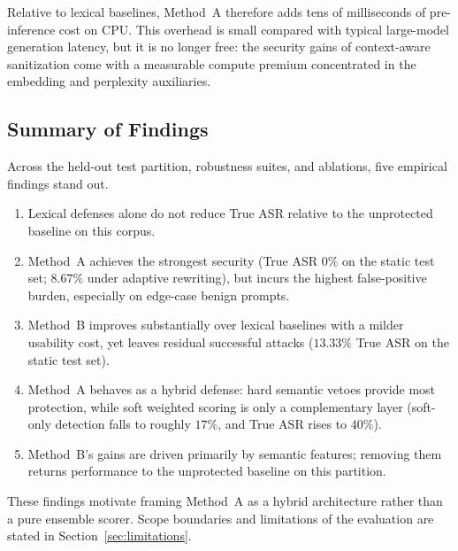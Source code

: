 Relative to lexical baselines, Method~A therefore adds tens of milliseconds of pre-inference cost on CPU.
This overhead is small compared with typical large-model generation latency, but it is no longer free: the security gains of context-aware sanitization come with a measurable compute premium concentrated in the embedding and perplexity auxiliaries.

\subsection{Summary of Findings}
\label{sec:results-summary}

Across the held-out test partition, robustness suites, and ablations, five empirical findings stand out.
\begin{enumerate}
  \item Lexical defenses alone do not reduce True ASR relative to the unprotected baseline on this corpus.
  \item Method~A achieves the strongest security (True ASR \(0\%\) on the static test set; \(8.67\%\) under adaptive rewriting), but incurs the highest false-positive burden, especially on edge-case benign prompts.
  \item Method~B improves substantially over lexical baselines with a milder usability cost, yet leaves residual successful attacks (\(13.33\%\) True ASR on the static test set).
  \item Method~A behaves as a hybrid defense: hard semantic vetoes provide most protection, while soft weighted scoring is only a complementary layer (soft-only detection falls to roughly \(17\%\), and True ASR rises to \(40\%\)).
  \item Method~B's gains are driven primarily by semantic features; removing them returns performance to the unprotected baseline on this partition.
\end{enumerate}
These findings motivate framing Method~A as a hybrid architecture rather than a pure ensemble scorer.
Scope boundaries and limitations of the evaluation are stated in Section~\ref{sec:limitations}.
